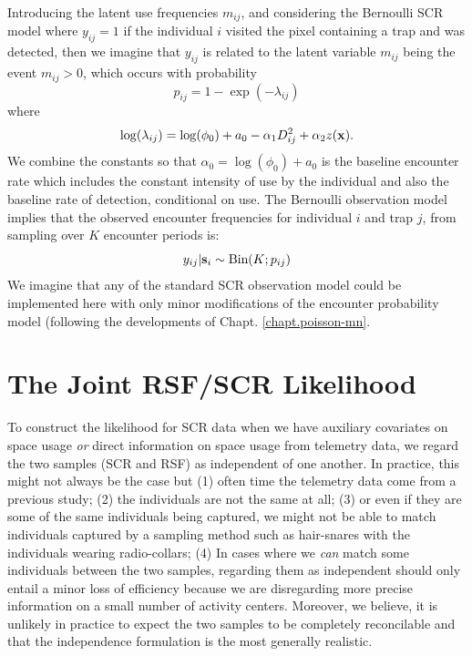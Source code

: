 Introducing the latent use
 frequencies $m_{ij}$, and considering the Bernoulli SCR model
where
$y_{ij} = 1$  if the individual $i$ visited the pixel
containing a trap and was detected, then
we imagine that $y_{ij}$ is related to the latent variable $m_{ij}$ being the
event $m_{ij}>0$, which occurs with probability
\[
 p_{ij} = 1-\exp(- \lambda_{ij})
\]
where
\[
 \log(\lambda_{ij}) = \log(\phi_{0}) + a_{0} -\alpha_{1} D_{ij}^{2} +  \alpha_{2} z({\bf x}).
\]
We combine the constants so that $\alpha_{0} = \log(\phi_{0}) + a_{0}$
is the baseline encounter rate which includes the constant intensity
of use by the individual and also the baseline rate of detection,
conditional on use.  The Bernoulli observation model implies that the
observed encounter frequencies for individual $i$ and trap $j$, from
sampling over $K$ encounter periods is:
\[
 y_{ij}|{\bf s}_{i} \sim \mbox{Bin}(K; p_{ij})
\]
We imagine that any of the standard SCR observation model could be
implemented here with only minor modifications of the encounter
probability model (following the developments of Chapt. \ref{chapt.poisson-mn}.


\section{The Joint RSF/SCR Likelihood}

To construct the likelihood for SCR data when we have auxiliary
covariates on space usage {\it or} direct information on space usage
from telemetry data, we regard the two samples (SCR and RSF) as
independent of one another. In practice, this might not always be the
case but (1) often time the telemetry data come from a previous study;
(2) the individuals are not the same at all; (3) or even if they are
some of the same individuals being captured, we might not be able to
match individuals captured by a sampling method such as hair-snares
with the individuals wearing radio-collars; (4) In cases where we {\it
  can} match some individuals between the two samples, regarding them as
independent should only entail a minor
loss of efficiency
because we are disregarding more precise information on a small number
of activity centers. Moreover, we believe, it is unlikely in practice
to expect the two samples to be completely reconcilable and that the
independence formulation is the most generally realistic.

